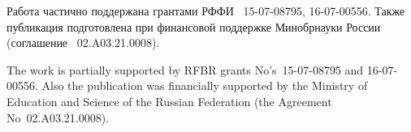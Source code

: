 \begin{Russian}
\def\acknowledgmentsname{Благодарности}
\end{Russian}

\begin{acknowledgments}


\begin{Russian}
Работа частично поддержана грантами РФФИ \textnumero~15-07-08795, 16-07-00556.
%
Также публикация подготовлена при финансовой поддержке Минобрнауки России
(соглашение \textnumero~02.A03.21.0008).
%
\end{Russian}
\begin{English}
The work is partially supported by RFBR grants No's~15-07-08795 and 16-07-00556.
%
Also the publication was financially supported by the Ministry of Education and
Science of the Russian Federation (the Agreement No~02.A03.21.0008).
%
\end{English}

\end{acknowledgments}


